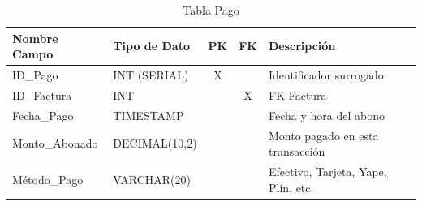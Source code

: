 \begin{table}[H]
\centering
\footnotesize
\begin{tabular}{|l|l|c|c|p{5cm}|}
\hline
\textbf{Nombre Campo} & \textbf{Tipo de Dato} & \textbf{PK} & \textbf{FK} & \textbf{Descripción} \\
\hline
ID\_Pago & INT (SERIAL) & X & & Identificador surrogado \\
\hline
ID\_Factura & INT & & X & FK Factura \\
\hline
Fecha\_Pago & TIMESTAMP & & & Fecha y hora del abono \\
\hline
Monto\_Abonado & DECIMAL(10,2) & & & Monto pagado en esta transacción \\
\hline
Método\_Pago & VARCHAR(20) & & & Efectivo, Tarjeta, Yape, Plin, etc. \\
\hline
\end{tabular}
\caption{Tabla Pago}
\end{table}
